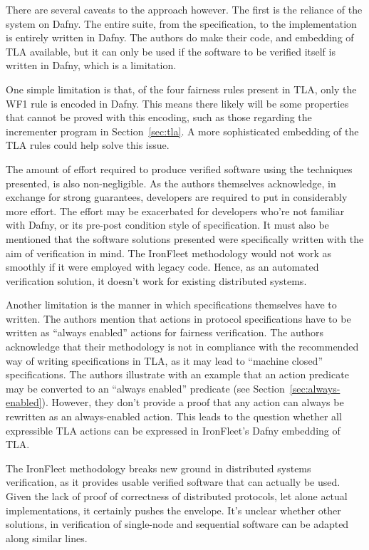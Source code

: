\documentclass{llncs}
\begin{document}
There are several caveats to the approach however. The first is the reliance of the system on Dafny.
 The entire suite, from the specification, to the implementation is entirely written in Dafny. The 
 authors do make their code, and embedding of TLA available, but it can only be used if the software
 to be verified itself is written in Dafny, which is a limitation.

 One simple limitation is that, of the four fairness rules present in TLA, only
 the WF1 rule is encoded in Dafny. This means there likely will be some
 properties that cannot be proved with this encoding, such as those regarding
 the incrementer program in Section~\ref{sec:tla}. A more sophisticated
 embedding of the TLA rules could help solve this issue.

 The amount of effort required to produce verified software using the techniques presented, is also 
 non-negligible. As the authors themselves acknowledge, in exchange for strong guarantees, developers
 are required to put in considerably more effort. The effort may be exacerbated for developers who're 
 not familiar with Dafny, or its pre-post condition style of specification. 
 It must also be mentioned that the software solutions presented were specifically written with 
 the aim of verification in mind. The IronFleet methodology would not work as smoothly if it were
 employed with legacy code. Hence, as an automated verification solution, it doesn't work for 
 existing distributed systems. 

 Another limitation is the manner in which specifications themselves have to written. The 
 authors mention that actions in protocol specifications have to be written as ``always enabled''
 actions for fairness verification. The authors acknowledge that their methodology is not 
 in compliance with the recommended way of writing specifications in TLA, as it may lead
 to ``machine closed'' specifications. The authors illustrate with an example that an action
 predicate may be converted to an ``always enabled'' predicate 
 (see Section~\ref{sec:always-enabled}). However, they don't provide a proof that any
 action can always be rewritten as an always-enabled action. This leads to the question
 whether all expressible TLA actions can be expressed in IronFleet's Dafny embedding of TLA.

 The IronFleet methodology breaks new ground in distributed systems verification, as it 
 provides usable verified software that can actually be used. Given the lack of proof of 
 correctness of distributed protocols, let alone actual implementations, it certainly 
 pushes the envelope. It's unclear whether other solutions, in verification of single-node and
 sequential software can be adapted along similar lines.
\end{document}
